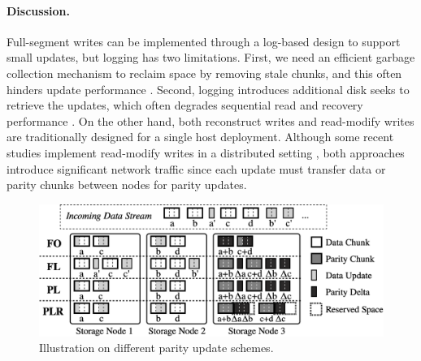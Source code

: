 \paragraph{Discussion.}  Full-segment writes can be implemented through a
log-based design to support small updates, but logging has two limitations.
First, we need an efficient garbage collection mechanism to reclaim space by
removing stale chunks, and this often hinders update performance
\cite{seltzer95}. Second, logging introduces additional disk seeks to retrieve
the updates, which often degrades sequential read and recovery performance
\cite{matthews97}. 
On the other hand, both reconstruct writes and read-modify writes 
are traditionally designed for a single host deployment. Although some recent
studies implement read-modify writes in a distributed setting
\cite{frolund04,zhang12}, both approaches
introduce significant network traffic since each update must transfer data or
parity chunks between nodes for parity updates. 



\begin{figure}[!t]
    \centering
    \includegraphics[width=4.8in]{figs/schemes_chunkflow}
    \vspace{-3pt}
    \caption{Illustration on different parity update schemes.}
    \label{fig:schemes_chunkflow}
\end{figure}

